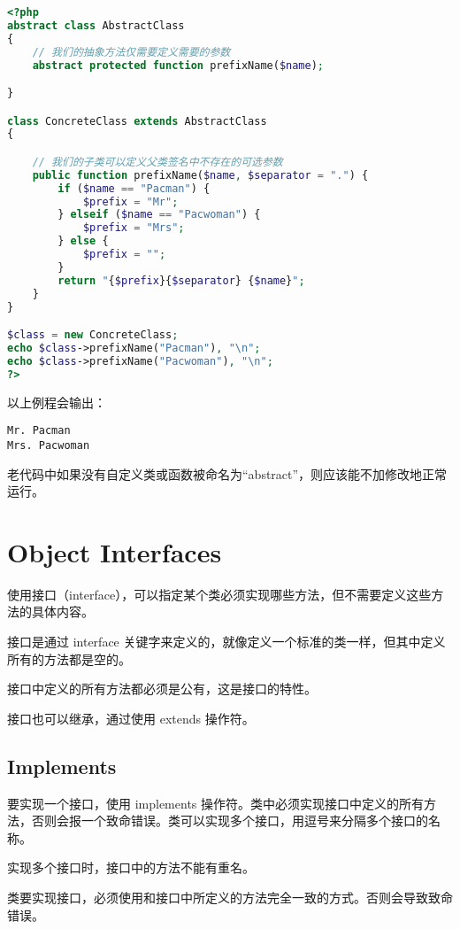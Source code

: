 \begin{lstlisting}[language=PHP]
<?php
abstract class AbstractClass
{
    // 我们的抽象方法仅需要定义需要的参数
    abstract protected function prefixName($name);

}

class ConcreteClass extends AbstractClass
{

    // 我们的子类可以定义父类签名中不存在的可选参数
    public function prefixName($name, $separator = ".") {
        if ($name == "Pacman") {
            $prefix = "Mr";
        } elseif ($name == "Pacwoman") {
            $prefix = "Mrs";
        } else {
            $prefix = "";
        }
        return "{$prefix}{$separator} {$name}";
    }
}

$class = new ConcreteClass;
echo $class->prefixName("Pacman"), "\n";
echo $class->prefixName("Pacwoman"), "\n";
?>
\end{lstlisting}


以上例程会输出：

\begin{verbatim}
Mr. Pacman
Mrs. Pacwoman
\end{verbatim}

老代码中如果没有自定义类或函数被命名为“abstract”，则应该能不加修改地正常运行。


\chapter{Object Interfaces}


使用接口（interface），可以指定某个类必须实现哪些方法，但不需要定义这些方法的具体内容。

接口是通过 interface 关键字来定义的，就像定义一个标准的类一样，但其中定义所有的方法都是空的。

接口中定义的所有方法都必须是公有，这是接口的特性。

接口也可以继承，通过使用 extends 操作符。

\section{Implements}


要实现一个接口，使用 implements 操作符。类中必须实现接口中定义的所有方法，否则会报一个致命错误。类可以实现多个接口，用逗号来分隔多个接口的名称。

实现多个接口时，接口中的方法不能有重名。



类要实现接口，必须使用和接口中所定义的方法完全一致的方式。否则会导致致命错误。






